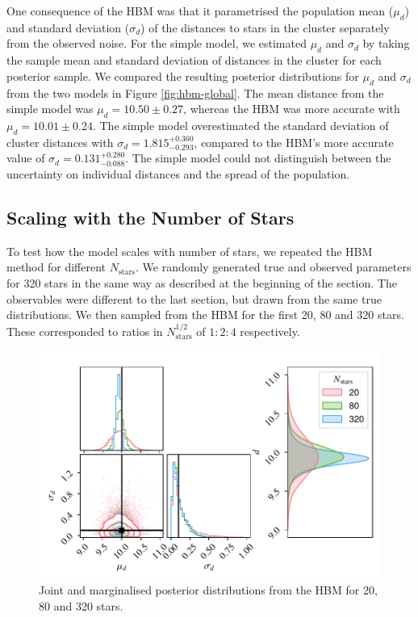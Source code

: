 One consequence of the HBM was that it parametrised the population mean (\(\mu_d\)) and standard deviation (\(\sigma_d\)) of the distances to stars in the cluster separately from the observed noise. For the simple model, we estimated \(\mu_d\) and \(\sigma_d\) by taking the sample mean and standard deviation of distances in the cluster for each posterior sample. We compared the resulting posterior distributions for \(\mu_d\) and \(\sigma_d\) from the two models in Figure \ref{fig:hbm-global}. The mean distance from the simple model was \(\mu_d = 10.50 \pm 0.27\), whereas the HBM was more accurate with \(\mu_d = 10.01 \pm 0.24\). The simple model overestimated the standard deviation of cluster distances with \(\sigma_d = 1.815_{-0.293}^{+0.360}\), compared to the HBM's more accurate value of \(\sigma_d = 0.131_{-0.088}^{+0.280}\). The simple model could not distinguish between the uncertainty on individual distances and the spread of the population.

\subsection{Scaling with the Number of Stars}\label{sec:hbm-scale}

To test how the model scales with number of stars, we repeated the HBM method for different \(N_\mathrm{stars}\). We randomly generated true and observed parameters for 320 stars in the same way as described at the beginning of the section. The observables were different to the last section, but drawn from the same true distributions. We then sampled from the HBM for the first 20, 80 and 320 stars. These corresponded to ratios in \(N_\mathrm{stars}^{1/2}\) of \(1:2:4\) respectively.

\begin{figure}[tb]
    \centering
    \includegraphics{figures/hbm-extended.pdf}
    \caption{Joint and marginalised posterior distributions from the HBM for 20, 80 and 320 stars.}
    \label{fig:hbm-extended}
\end{figure}

